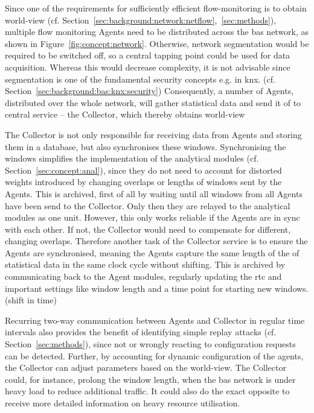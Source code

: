 Since one of the requirements for sufficiently efficient flow-monitoring is to obtain world-view (cf. Section~\ref{sec:background:network:netflow},~\ref{sec:methods}), multiple flow monitoring Agents need to be distributed across the \gls{bas} network, as shown in Figure~\ref{fig:concept:network}. Otherwise, network segmentation would be required to be switched off, so a central tapping point could be used for data acquisition.
Whereas this would decrease complexity, it is not advisable since segmentation is one of the fundamental security concepts e.g. in \gls{knx}. (cf. Section~\ref{sec:background:bas:knx:security})
Consequently, a number of Agents, distributed over the whole network, will gather statistical data and send it of to central service -- the Collector, which thereby obtains world-view

The Collector is not only responsible for receiving data from Agents and storing them in a database, but also synchronises these windows. Synchronising the windows simplifies the implementation of the analytical modules (cf. Section~\ref{sec:concept:anal}), since they do not need to account for distorted weights introduced by changing overlaps or lengths of windows sent by the Agents.
This is archived, first of all by waiting until all windows from all Agents have been send to the Collector. Only then they are relayed to the analytical modules as one unit.
However, this only works reliable if the Agents are in sync with each other. If not, the Collector would need to compensate for different, changing overlaps. Therefore another task of the Collector service is to ensure the Agents are synchronised, meaning the Agents capture the same length of the of statistical data in the same clock cycle without shifting.
This is archived by communicating back to the Agent modules, regularly updating the \gls{rtc} and important settings like window length and a time point for starting new windows. (shift in time)

Recurring two-way communication between Agents and Collector in regular time intervals also provides the benefit of identifying simple replay attacks (cf. Section~\ref{sec:methods}), since not or wrongly reacting to configuration requests can be detected.
Further, by accounting for dynamic configuration of the agents, the Collector can adjust parameters based on the world-view.
The Collector could, for instance, prolong the window length, when the \gls{bas} network is under heavy load to reduce additional traffic. It could also do the exact opposite to receive more detailed information on heavy resource utilisation.

